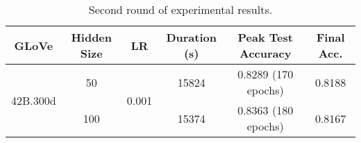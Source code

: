 \begin{table}
\begin{tabular}{@{}|c|c|c|c|c|c|@{}}
\toprule
\textbf{GLoVe}            & \textbf{Hidden Size} & \textbf{LR}            & \textbf{Duration (s)} & \textbf{Peak Test Accuracy} & \textbf{Final Acc.} \\ \midrule
\multirow{2}{*}{42B.300d} & 50                   & \multirow{2}{*}{0.001} & 15824                 & 0.8289 (170 epochs)         & 0.8188              \\ \cmidrule(lr){2-2} \cmidrule(l){4-6} 
                          & 100                  &                        & 15374                 & 0.8363 (180 epochs)         & 0.8167              \\ \bottomrule
\end{tabular}
\caption{Second round of experimental results.}
\label{tab:round2}
\end{table}